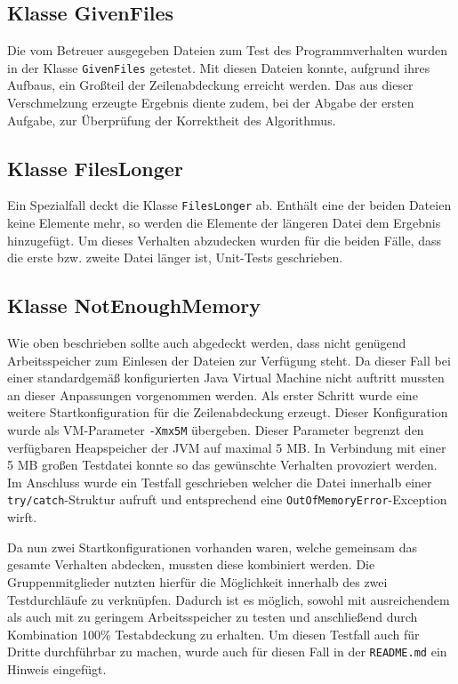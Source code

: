 \documentclass[a4paper,titlepage,12pt]{scrartcl}
\begin{document}
\subsection{Klasse GivenFiles}
\label{sec:givenfiles}
Die vom Betreuer ausgegeben Dateien zum Test des Programmverhalten wurden in der Klasse \texttt{GivenFiles} getestet. Mit diesen Dateien konnte, aufgrund ihres Aufbaus, ein Großteil der Zeilenabdeckung erreicht werden. Das aus dieser Verschmelzung erzeugte Ergebnis diente zudem, bei der Abgabe der ersten Aufgabe, zur Überprüfung der Korrektheit des Algorithmus.

\subsection{Klasse FilesLonger}
\label{sec:fileslonger}
Ein Spezialfall deckt die Klasse \texttt{FilesLonger} ab. Enthält eine der beiden Dateien keine Elemente mehr, so werden die Elemente der längeren Datei dem Ergebnis hinzugefügt.
Um dieses Verhalten abzudecken wurden für die beiden Fälle, dass die erste bzw. zweite Datei länger ist, Unit-Tests geschrieben.

\subsection{Klasse NotEnoughMemory}
\label{sec:notenoughmemory}
Wie oben beschrieben sollte auch abgedeckt werden, dass nicht genügend Arbeitsspeicher zum Einlesen der Dateien zur Verfügung steht.
Da dieser Fall bei einer standardgemäß konfigurierten Java Virtual Machine nicht auftritt mussten an dieser Anpassungen vorgenommen werden.	Als erster Schritt wurde eine weitere Startkonfiguration für die Zeilenabdeckung erzeugt. Dieser Konfiguration wurde als VM-Parameter \texttt{-Xmx5M} übergeben.
Dieser Parameter begrenzt den verfügbaren Heapspeicher der JVM auf maximal 5 MB. In Verbindung mit einer 5 MB großen Testdatei konnte so das gewünschte Verhalten provoziert werden.
Im Anschluss wurde ein Testfall geschrieben welcher die Datei innerhalb einer \texttt{try/catch}-Struktur aufruft und entsprechend eine \texttt{OutOfMemoryError}-Exception wirft.

Da nun zwei Startkonfigurationen vorhanden waren, welche gemeinsam das gesamte Verhalten abdecken, mussten diese kombiniert werden.
Die Gruppenmitglieder nutzten hierfür die Möglichkeit innerhalb des \citep{www:ECLEMMA} zwei Testdurchläufe zu verknüpfen.
Dadurch ist es möglich, sowohl mit ausreichendem als auch mit zu geringem Arbeitsspeicher zu testen und anschließend durch Kombination 100\% Testabdeckung zu erhalten.
Um diesen Testfall auch für Dritte durchführbar zu machen, wurde auch für diesen Fall in der \texttt{README.md} ein Hinweis eingefügt.

\clearpage
\appendix



\end{document}
